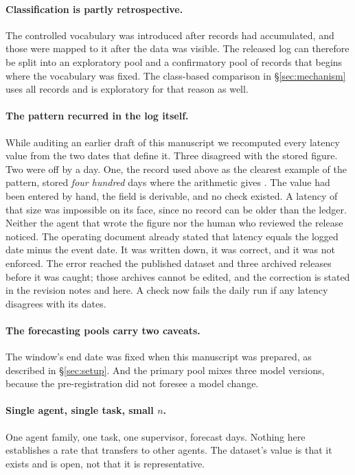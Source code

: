 \documentclass[11pt,a4paper]{article}
\begin{document}
\paragraph{Classification is partly retrospective.} The controlled vocabulary
was introduced after \VocabFreezeN{} records had accumulated, and those were
mapped to it after the data was visible. The released log can therefore be
split into an exploratory pool and a confirmatory pool of \ConfirmN{} records
that begins where the vocabulary was fixed. The class-based comparison in
\S\ref{sec:mechanism} uses all records and is exploratory for that reason as
well.

\paragraph{The pattern recurred in the log itself.} While auditing an earlier
draft of this manuscript we recomputed every latency value from the two dates
that define it. Three disagreed with the stored figure. Two were off by a day.
One, the record used above as the clearest example of the pattern, stored
\emph{four hundred} days where the arithmetic gives \KNineThreeLat. The value
had been entered by hand, the field is derivable, and no check existed. A
latency of that size was impossible on its face, since no record can be older
than the ledger. Neither the agent that wrote the figure nor the human who
reviewed the release noticed. The operating document already stated that
latency equals the logged date minus the event date. It was written down, it
was correct, and it was not enforced. The error reached the published
dataset and three archived releases before it was caught; those archives
cannot be edited, and the correction is stated in the revision notes and
here. A check now fails the
daily run if any latency disagrees with its dates.

\paragraph{The forecasting pools carry two caveats.} The window's end date was
fixed when this manuscript was prepared, as described in \S\ref{sec:setup}.
And the primary pool mixes three model versions, because the pre-registration
did not foresee a model change.

\paragraph{Single agent, single task, small $n$.} One agent family, one task,
one supervisor, \NumDays{} forecast days. Nothing here establishes a rate that
transfers to other agents. The dataset's value is that it exists and is open,
not that it is representative.
\end{document}
